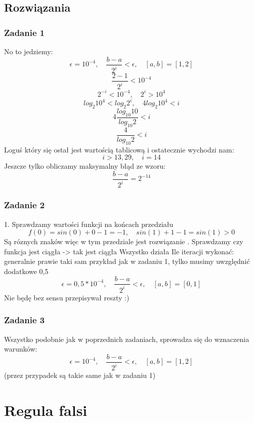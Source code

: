 \documentclass[a4paper]{article}
\begin{document}
\subsection{Rozwiązania}
\subsubsection*{Zadanie 1}
No to jedziemy: 
$$\epsilon = 10^{-4},\quad \frac{b-a}{2^i}<\epsilon ,\quad [a,b]=[1,2]$$
$$ \frac{2-1}{2^i} < 10^{-4}$$
$$ 2^{-i} < 10^{-4}, \quad 2^i>10^4$$
$$ log_2 10^4 < log_2 2^i , \quad 4log_2 10^4 < i$$
$$ 4\frac{log_{10}10}{log_{10}2}<i $$
$$ \frac{4}{log_{10}2}<i $$
Loguś który się ostał jest wartością tablicową i ostatecznie wychodzi nam: 
$$ i>13,29 ,\quad i = 14$$
Jeszcze tylko obliczamy maksymalny błąd ze wzoru:
$$ \frac{b-a}{2^i} = 2^{-14}$$

\subsubsection*{Zadanie 2}
1. Sprawdzamy wartości funkcji na końcach przedziału
$$f(0) = sin(0) + 0 - 1 = -1, \quad sin(1) +1 -1 = sin(1)>0 $$
Są róznych znaków więc w tym przedziale jest rozwiązanie . Sprawdzamy czy funkcja jest ciągła -> tak jest ciągła
\newline Wszystko działa
\newline Ile iteracji wykonać: generalnie prawie taki sam przykład jak w zadaniu 1, tylko musimy uwzględnić dodatkowe 0,5
$$\epsilon = 0,5*10^{-4},\quad \frac{b-a}{2^i}<\epsilon ,\quad [a,b]=[0,1]$$
Nie będę bez sensu przepisywał reszty :)
\subsubsection*{Zadanie 3}
Wszystko podobnie jak w poprzednich zadaniach, sprowadza się do wznaczenia warunków:
$$\epsilon = 10^{-4},\quad \frac{b-a}{2^i}<\epsilon ,\quad [a,b]=[1,2]$$
(przez przypadek są takie same jak w zadaniu 1)

\section{Regula falsi}
\end{document}
